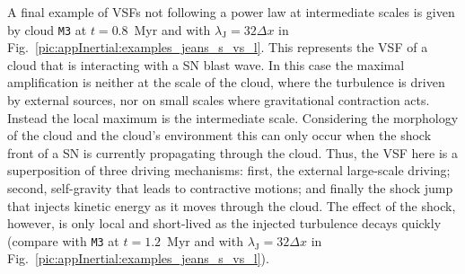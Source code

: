A final example of VSFs not following a power law at intermediate scales is given by cloud \texttt{M3} at $t=0.8$~Myr and with $\lambda_\mathrm{J} = 32\Delta x$ in Fig.~\ref{pic:appInertial:examples_jeans_s_vs_l}.
This represents the VSF of a cloud that is interacting with a SN blast wave.
In this case the maximal amplification is neither at the scale of the cloud, where the turbulence is driven by external sources, nor on small scales where gravitational contraction acts.
Instead the local maximum is the intermediate scale. 
Considering the morphology of the cloud and the cloud's environment this can only occur when the shock front of a SN is currently propagating through the cloud. 
Thus, the VSF here is a superposition of three driving mechanisms:
first, the external large-scale driving; second, self-gravity that leads to contractive motions; and finally the shock jump that injects kinetic energy as it moves through the cloud. 
The effect of the shock, however, is only local and short-lived as the injected turbulence decays quickly (compare with \texttt{M3} at $t=1.2$~Myr and with $\lambda_\mathrm{J} = 32\Delta x$ in Fig.~\ref{pic:appInertial:examples_jeans_s_vs_l}).












